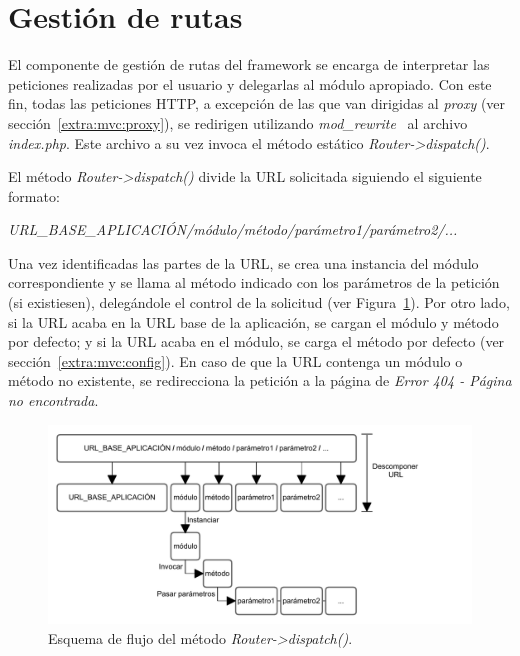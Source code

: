 \section{Gestión de rutas\label{extra:mvc:router}}

El componente de gestión de rutas del \gls{framework} se encarga de interpretar las peticiones realizadas por el usuario y delegarlas al módulo apropiado.
Con este fin, todas las peticiones \gls{HTTP}, a excepción de las que van dirigidas al \textit{proxy} (ver sección~\ref{extra:mvc:proxy}), se redirigen utilizando \textit{mod\_rewrite}~\cite{modrewrite} al archivo \textit{index.php}.
Este archivo a su vez invoca el método estático \textit{Router->dispatch()}.

El método \textit{Router->dispatch()} divide la \gls{URL} solicitada siguiendo el siguiente formato:

\textit{URL\_BASE\_APLICACIÓN/módulo/método/parámetro1/parámetro2/...}

Una vez identificadas las partes de la \gls{URL}, se crea una instancia del módulo correspondiente y se llama al método indicado con los parámetros de la petición (si existiesen), delegándole el control de la solicitud (ver Figura~\ref{fig:router}).
Por otro lado, si la \gls{URL} acaba en la \gls{URL} base de la aplicación, se cargan el módulo y método por defecto; y si la \gls{URL} acaba en el módulo, se carga el método por defecto (ver sección~\ref{extra:mvc:config}).
En caso de que la \gls{URL} contenga un módulo o método no existente, se redirecciona la petición a la página de \textit{Error 404 - Página no encontrada}.

\begin{figure}[!htp]
  \centering
  \includegraphics[width=\textwidth,clip=true]{graphics/router}
  \caption{Esquema de flujo del método \textit{Router->dispatch()}.}
  \label{fig:router}
\end{figure}


